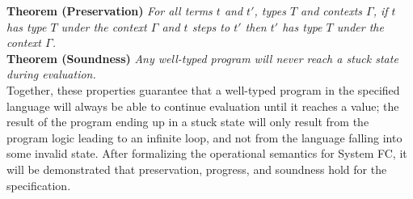 \documentclass{sig-alternate}
\begin{document}
\noindent\textbf{Theorem (Preservation)} \textit{For all terms $t$ and $t'$, types $T$ and contexts $\Gamma$, if $t$ has type $T$ under the context $\Gamma$ and $t$ steps to $t'$ then $t'$ has type $T$ under the context $\Gamma$.} \\

\noindent\textbf{Theorem (Soundness)} \textit{Any well-typed program will never reach a stuck state during evaluation.}\\

Together, these properties guarantee that a well-typed program in the specified language will always be able to continue evaluation until it reaches a value; the result of the program ending up in a stuck state will only result from the program logic leading to an infinite loop, and not from the language falling into some invalid state. After formalizing the operational semantics for System FC, it will be demonstrated that preservation, progress, and soundness hold for the specification.
\end{document}

